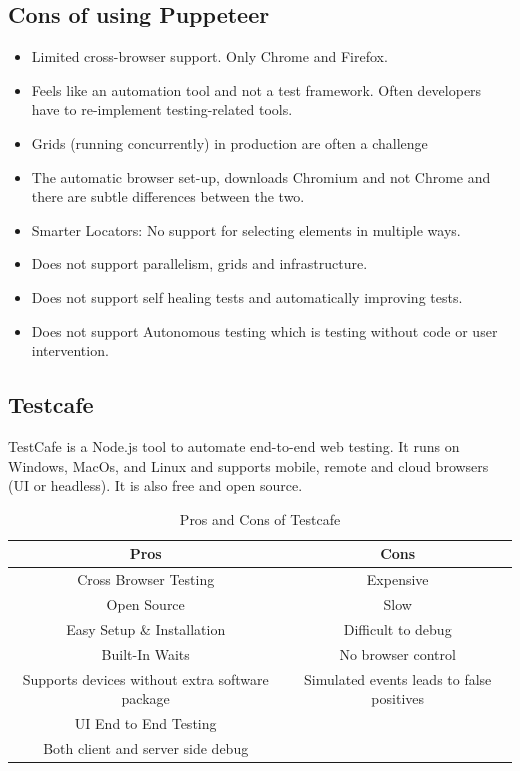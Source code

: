 \documentclass[12pt,a4paper,titlepage]{report}
\begin{document}
\subsection{Cons of using Puppeteer}
\begin{itemize}
 \item Limited cross-browser support. Only Chrome and Firefox.
 \item Feels like an automation tool and not a test framework. Often developers have to re-implement testing-related tools.
 \item Grids (running concurrently) in production are often a challenge
 \item The automatic browser set-up, downloads Chromium and not Chrome and there are subtle differences between the two.
 \item Smarter Locators: No support for selecting elements in multiple ways.
 \item Does not support parallelism, grids and infrastructure.
 \item Does not support self healing tests and automatically improving tests.
 \item Does not support Autonomous testing which is testing without code or user intervention.
\end{itemize}

\subsection{Testcafe}

TestCafe is a Node.js tool to automate end-to-end web testing. It runs on Windows, MacOs, and Linux and
supports mobile, remote and cloud browsers (UI or headless). It is also free and open source.

\begin{table}[ht]
  \centering
  \small
  \setlength\tabcolsep{6pt}
  \begin{tabular}{|c|c|}
   \hline \textbf
   {Pros} & \textbf {Cons}\\
   \hline\hline
   Cross Browser Testing&Expensive\\
   \hline
   Open Source& Slow\\
   \hline
   Easy Setup \& Installation& Difficult to debug\\
   \hline
   Built-In Waits& No browser control\\
   \hline
   Supports devices without extra software package & Simulated events leads to false positives\\
   \hline
   UI End to End Testing\\
   \hline
   Both client and server side debug \\
   \hline
  \end{tabular}
  \caption{Pros and Cons of Testcafe}
 \end{table}
\end{document}
